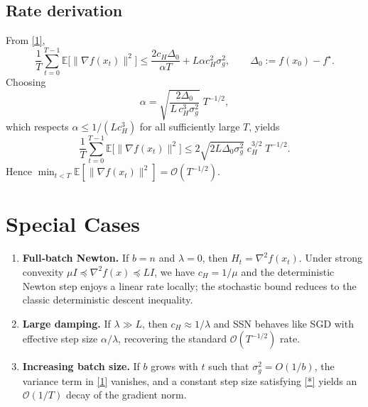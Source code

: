 \documentclass{article}
\newcommand{\E}{\mathbb{E}}
\begin{document}
\subsection*{Rate derivation}
From \eqref{1},
\[
\frac1T\sum_{t=0}^{T-1}\E\!\big[\|\nabla f(x_t)\|^{2}\big]
\le \frac{2c_H\Delta_0}{\alpha T}+L\alpha c_H^{2}\sigma_g^{2},
\qquad\Delta_0:=f(x_0)-f^\star .
\]
Choosing 
\[
\alpha = \sqrt{\frac{2\Delta_0}{L\,c_H^{3}\sigma_g^{2}}}\;T^{-1/2},
\]
which respects $\alpha\le 1/(L c_H^{3})$ for all sufficiently large $T$, yields
\[
\frac1T\sum_{t=0}^{T-1}\E\!\big[\|\nabla f(x_t)\|^{2}\big]
\le 2\sqrt{2L\Delta_0\sigma_g^{2}}\;c_H^{3/2}\;T^{-1/2}.
\]
Hence $\min_{t<T}\E[\|\nabla f(x_t)\|^{2}]=\mathcal{O}(T^{-1/2})$.

\section*{Special Cases}
\begin{enumerate}[label={\arabic*.}]
\item \textbf{Full‑batch Newton.} If $b=n$ and $\lambda=0$, then $H_t=\nabla^2 f(x_t)$. Under strong convexity $\mu I\preceq\nabla^2 f(x)\preceq L I$, we have $c_H=1/\mu$ and the deterministic Newton step enjoys a linear rate locally; the stochastic bound reduces to the classic deterministic descent inequality.
\item \textbf{Large damping.} If $\lambda\gg L$, then $c_H\approx 1/\lambda$ and SSN behaves like SGD with effective step size $\alpha/\lambda$, recovering the standard $\mathcal{O}(T^{-1/2})$ rate.
\item \textbf{Increasing batch size.} If $b$ grows with $t$ such that $\sigma_g^{2}=O(1/b)$, the variance term in \eqref{1} vanishes, and a constant step size satisfying \eqref{*} yields an $\mathcal{O}(1/T)$ decay of the gradient norm.
\end{enumerate}
\end{document}

